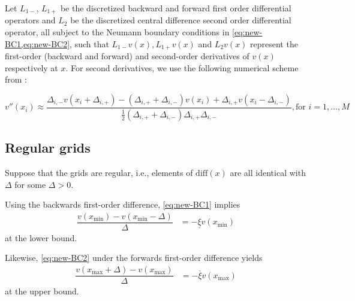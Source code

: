 \documentclass[11pt]{article}
\begin{document}
Let $L_{1-}$, $L_{1+}$ be the discretized backward and forward first order differential operators and $L_2$ be the discretized central difference  second order differential operator, all subject to the Neumann boundary conditions in \cref{eq:new-BC1,eq:new-BC2}, such that $L_{1-} v(x), L_{1+} v(x)$ and $L_2 v(x)$ represent the first-order (backward and forward) and second-order derivatives of $v(x)$ respectively at $x$. For second derivatives, we use the following numerical scheme from \cite{achdou17}:

\begin{equation}
v''(x_i) \approx \dfrac{ \Delta_{i,-} v( x_i + \Delta_{i,+}) - (\Delta_{i,+} + \Delta_{i,-}) v( x_i ) + \Delta_{i,+} v( x_i - \Delta_{i,-})}{\frac{1}{2}(\Delta_{i,+} + \Delta_{i,-}) \Delta_{i,+} \Delta_{i,-} }, \text{for } i = 1, \ldots, M
\end{equation}





\subsection{Regular grids}
Suppose that the grids are regular, i.e., elements of $\text{diff}(x)$ are all identical with $\Delta$ for some $\Delta > 0$.

Using the backwards first-order difference, \eqref{eq:new-BC1} implies
\begin{align}
\dfrac{v({x_{\min}}) - v({x_{\min}}-\Delta)}{\Delta} &= - \underline{\xi} v({x_{\min}})
\end{align}
at the lower bound.

Likewise, \eqref{eq:new-BC2} under the forwards first-order difference yields
\begin{align}
\dfrac{v({x_{\max}} + \Delta) - v({x_{\max}})}{\Delta} &= - \overline{\xi} v({x_{\max}})
\end{align}
at the upper bound.
\end{document}
